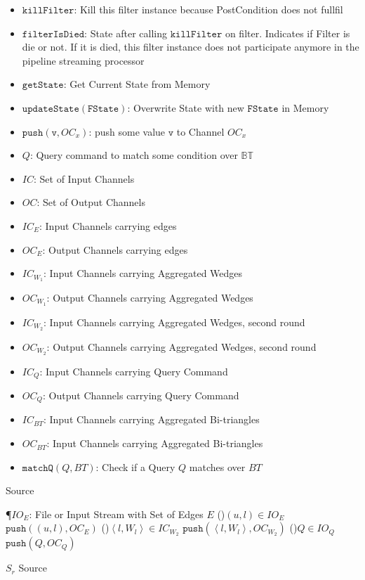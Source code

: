 \documentclass[12pt, a4paper]{article}
\newcommand{\bt}{\mathbb{BT}}
\newcommand{\st}{\mathtt{FState}}
\newcommand{\fd}{\mathtt{killFilter}}
\newcommand{\fid}{\mathtt{filterIsDied}}
\newcommand{\us}{\mathtt{updateState}}
\newcommand{\gs}{\mathtt{getState}}
\newcommand{\p}{\mathtt{push}}
\newcommand{\mt}{\mathtt{matchQ}}
\newcommand{\la}{\left\langle}
\newcommand{\ra}{\right\rangle}
\begin{document}
\begin{itemize}
      \item $\fd$: Kill this filter instance because PostCondition does not fullfil
      \item $\fid$: State after calling $\fd$ on filter. Indicates if Filter is die or not. If it is died, this filter instance does not participate anymore in the pipeline streaming processor
      \item $\gs$: Get Current State from Memory
      \item $\us(\st)$: Overwrite State with new $\st$ in Memory
      \item $\p(\mathtt{v}, OC_x)$: push some value $\mathtt{v}$ to Channel $OC_x$
      \item $Q$: Query command to match some condition over $\bt$
      \item $IC$: Set of Input Channels
      \item $OC$: Set of Output Channels    
      \item $IC_E$: Input Channels carrying edges
      \item $OC_E$: Output Channels carrying edges
      \item $IC_{W_1}$: Input Channels carrying Aggregated Wedges
      \item $OC_{W_1}$: Output Channels carrying Aggregated Wedges
      \item $IC_{W_2}$: Input Channels carrying Aggregated Wedges, second round
      \item $OC_{W_2}$: Output Channels carrying Aggregated Wedges, second round
      \item $IC_Q$: Input Channels carrying Query Command
      \item $OC_Q$: Output Channels carrying Query Command
      \item $IC_{BT}$: Input Channels carrying Aggregated Bi-triangles 
      \item $OC_{BT}$: Input Channels carrying Aggregated Bi-triangles 
      \item $\mt(Q, BT)$: Check if a Query $Q$ matches over $BT$ 
\end{itemize}

Source

\begin{algorithm}
\P{$IO_E$: File or Input Stream with Set of Edges $E$}
\IC{$IC = \la IC_{W_2} \ra$}
\OC{$OC = \la OC_E, OC_{W_2}, OC_Q \ra$}
\ForAll(){$(u,l) \in IO_E$}
{$\p((u,l), OC_E)$
}
\ForAll(){$\la l, W_l \ra \in IC_{W_2}$}
{$\p(\la l, W_l \ra, OC_{W_2})$
}
\ForAll(){$Q \in IO_Q$}
{$\p(Q, OC_Q)$
}
\caption{$S_r$ Source}
\end{algorithm}
\end{document}
